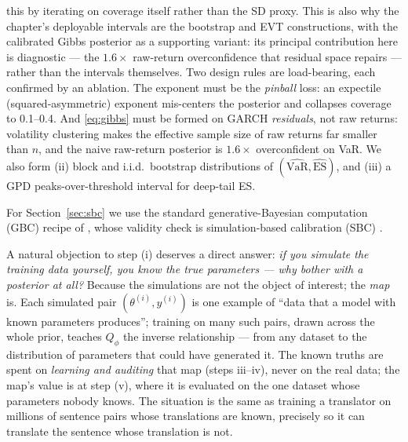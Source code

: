 \documentclass[11pt]{article}
\newcommand{\VaR}{\mathrm{VaR}}
\newcommand{\ES}{\mathrm{ES}}
\theoremstyle{remark}
\begin{document}
this by iterating on coverage itself rather than the SD proxy. This is also why the chapter's
deployable intervals are the bootstrap and EVT constructions, with the
calibrated Gibbs posterior as a supporting variant: its principal
contribution here is diagnostic --- the $1.6\times$ raw-return
overconfidence that residual space repairs --- rather than the
intervals themselves. Two design rules are
load-bearing, each confirmed by an ablation. The exponent must be the
\emph{pinball} loss: an expectile (squared-asymmetric) exponent
mis-centers the posterior and collapses coverage to 0.1--0.4. And
\eqref{eq:gibbs} must be formed on GARCH \emph{residuals}, not raw
returns: volatility clustering makes the effective sample size of raw
returns far smaller than $n$, and the naive raw-return posterior is
$1.6\times$ overconfident on VaR. We also form (ii) block and i.i.d.\
bootstrap distributions of $(\widehat{\VaR}, \widehat{\ES})$, and (iii)
a GPD peaks-over-threshold interval for deep-tail ES.

For Section~\ref{sec:sbc} we use the standard generative-Bayesian
computation (GBC) recipe of
\citet{polson2023gbc}, whose validity check is simulation-based
calibration (SBC) \citep{talts2018sbc}.

\medskip\noindent{}

\medskip
A natural objection to step (i) deserves a direct answer: \emph{if you
simulate the training data yourself, you know the true parameters ---
why bother with a posterior at all?} Because the simulations are not
the object of interest; the \emph{map} is. Each simulated pair
$(\theta^{(i)}, y^{(i)})$ is one example of ``data that a model with
known parameters produces''; training on many such pairs, drawn across
the whole prior, teaches $Q_\phi$ the inverse relationship --- from any
dataset to the distribution of parameters that could have generated it.
The known truths are spent on \emph{learning and auditing} that map
(steps iii--iv), never on the real data; the map's value is at step
(v), where it is evaluated on the one dataset whose parameters nobody
knows. The situation is the same as training a translator on millions
of sentence pairs whose translations are known, precisely so it can
translate the sentence whose translation is not.
\end{document}
